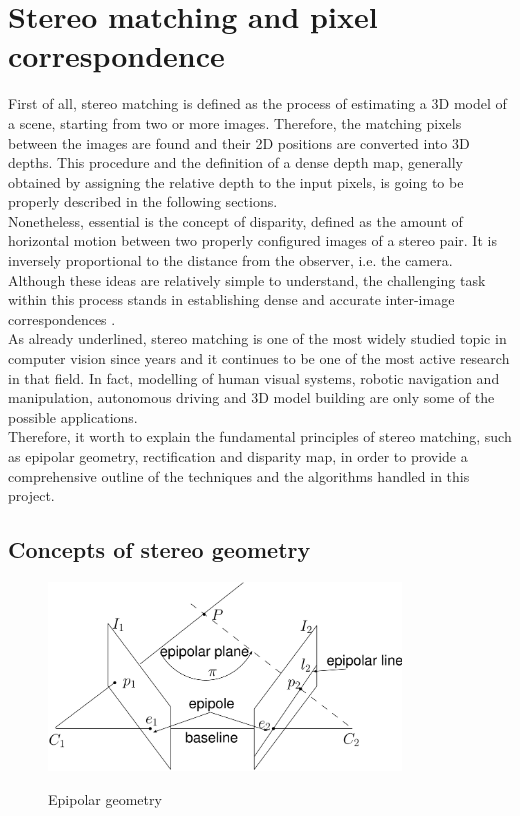 \section{Stereo matching and pixel correspondence}
\label{section:stereo-match-and-corr}

First of all, stereo matching is defined as the process of estimating a 3D model of a scene, starting from two or more images. 
Therefore, the matching pixels between the images are found and their 2D positions are converted into 3D depths. 
This procedure and the definition of a dense depth map, generally obtained by assigning the relative depth to the input pixels, is going to be properly described in the following sections.\\
Nonetheless, essential is the concept of disparity, defined as the amount of horizontal motion between two properly configured images of a stereo pair. 
It is inversely proportional to the distance from the observer, i.e. the camera. 
Although these ideas are relatively simple to understand, the challenging task within this process stands in establishing dense and accurate inter-image correspondences \cite{Szeliski2011}.\\
As already underlined, stereo matching is one of the most widely studied topic in computer vision since years and it continues to be one of the most active research in that field. 
In fact, modelling of human visual systems, robotic navigation and manipulation, autonomous driving \cite{Poggi2019} and 3D model building are only some of the possible applications.\\
Therefore, it worth to explain the fundamental principles of stereo matching, such as epipolar geometry, rectification and disparity map, in order to provide a comprehensive outline of the techniques and the algorithms handled in this project.\\

\subsection{Concepts of stereo geometry}
\label{subsection:stereo-geometry-basics}

\begin{figure}[t]
	\begin{center}
		{\includegraphics[width=.8\textwidth, height=5cm, keepaspectratio]{images/epipolar-geometry}}
\caption{Epipolar geometry}
\label{fig:epipolargeom}
	\end{center}
\end{figure}

